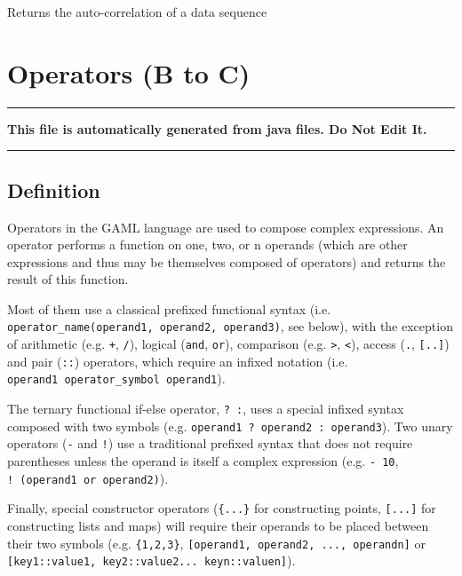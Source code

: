 \documentclass[]{book}
\theoremstyle{definition}
\theoremstyle{definition}
\theoremstyle{definition}
\theoremstyle{remark}
\begin{document}
Returns the auto-correlation of a data sequence

\chapter{Operators (B to C)}\label{operators-b-to-c}

\begin{center}\rule{0.5\linewidth}{\linethickness}\end{center}

\textbf{This file is automatically generated from java files. Do Not
Edit It.}

\begin{center}\rule{0.5\linewidth}{\linethickness}\end{center}

\section{Definition}\label{definition-1}

Operators in the GAML language are used to compose complex expressions.
An operator performs a function on one, two, or n operands (which are
other expressions and thus may be themselves composed of operators) and
returns the result of this function.

Most of them use a classical prefixed functional syntax (i.e.
\texttt{operator\_name(operand1,\ operand2,\ operand3)}, see below),
with the exception of arithmetic (e.g. \texttt{+}, \texttt{/}), logical
(\texttt{and}, \texttt{or}), comparison (e.g. \texttt{\textgreater{}},
\texttt{\textless{}}), access (\texttt{.}, \texttt{{[}..{]}}) and pair
(\texttt{::}) operators, which require an infixed notation (i.e.
\texttt{operand1\ operator\_symbol\ operand1}).

The ternary functional if-else operator, \texttt{?\ :}, uses a special
infixed syntax composed with two symbols (e.g.
\texttt{operand1\ ?\ operand2\ :\ operand3}). Two unary operators
(\texttt{-} and \texttt{!}) use a traditional prefixed syntax that does
not require parentheses unless the operand is itself a complex
expression (e.g. \texttt{-\ 10}, \texttt{!\ (operand1\ or\ operand2)}).

Finally, special constructor operators (\texttt{\{...\}} for
constructing points, \texttt{{[}...{]}} for constructing lists and maps)
will require their operands to be placed between their two symbols (e.g.
\texttt{\{1,2,3\}}, \texttt{{[}operand1,\ operand2,\ ...,\ operandn{]}}
or \texttt{{[}key1::value1,\ key2::value2...\ keyn::valuen{]}}).
\end{document}
